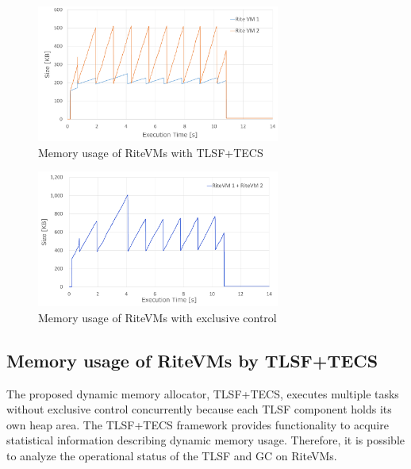 \documentclass[JIP]{ipsj_v2/UTF8/ipsj}
\begin{document}
\begin{figure}[t]
    \centering
    \includegraphics[width=8cm,clip]{figure/EvaluationOfTLSFStatistics.pdf}
    \caption{Memory usage of RiteVMs with TLSF+TECS}
    \label{fig:EvaluationOfTLSFStatistics}
\end{figure}

\begin{figure}[t]
    \centering
    \includegraphics[width=8cm,clip]{figure/EvaluationOfMemoryUsageWithExclusiveContorol.pdf}
    \caption{Memory usage of RiteVMs with exclusive control}
    \label{fig:EvaluationOfMemoryUsageWithExclusiveContorol}
\end{figure}

\subsection{Memory usage of RiteVMs by TLSF+TECS}

The proposed dynamic memory allocator, TLSF+TECS, executes multiple tasks without exclusive control concurrently because each TLSF component holds its own heap area.
The TLSF+TECS framework provides functionality to acquire statistical information describing dynamic memory usage.
Therefore, it is possible to analyze the operational status of the TLSF and GC on RiteVMs.
\end{document}
